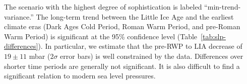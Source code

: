 \documentclass[12pt]{article}
\begin{document}





The scenario with the highest degree of sophistication is labeled ``min-trend-variance.''
The long-term trend between the Little Ice Age and the earliest climate eras (Dark Ages Cold Period, Roman Warm Period, and pre-Roman Warm Period) is significant at the 95\% confidence level (Table~\ref{tab:slp-differences}). In particular, we estimate that the pre-RWP to LIA decrease 
of $19 \pm 11$ mbar ($2\sigma$ error bars) is well constrained by the data.
Differences over shorter time periods are generally not significant. It is also difficult to find a significant relation to modern sea level pressures.
\end{document}
